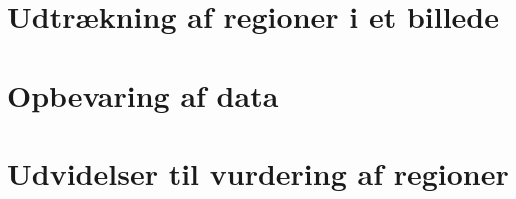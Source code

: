{\section{Udtrækning af regioner i et billede\label{section_udtraek}}


\section{Opbevaring af data\label{section_database}}


\section{Udvidelser til vurdering af regioner\label{section_udvidelser}}


}

